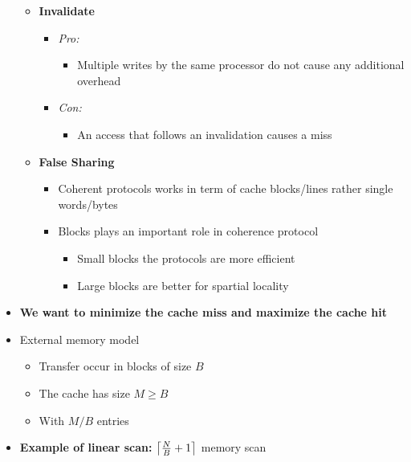 \documentclass[12pt,oneside]{report}
\DeclarePairedDelimiter\ceil{\lceil}{\rceil}
\begin{document}
\begin{itemize}
\begin{itemize}
\begin{itemize}
\begin{itemize}
            \end{itemize}
        \end{itemize}
        \item \textbf{Invalidate}
        \begin{itemize}
            \item \textit{Pro:}
            \begin{itemize}
                \item Multiple writes by the same processor do not cause any additional overhead
            \end{itemize}
            \item \textit{Con:}
            \begin{itemize}
                \item An access that follows an invalidation causes a miss
            \end{itemize}
        \end{itemize}
        \item \textbf{False Sharing}
        \begin{itemize}
            \item Coherent protocols works in term of cache blocks/lines rather single words/bytes
            \item Blocks plays an important role in coherence protocol
            \begin{itemize}
                \item Small blocks the protocols are more efficient
                \item Large blocks are better for spartial locality
            \end{itemize}
        \end{itemize}
    \end{itemize}
    \item \textbf{We want to minimize the cache miss and maximize the cache hit}
    \item External memory model
    \begin{itemize}
        \item Transfer occur in blocks of size \(B\)
        \item The cache has size \(M \geq B\)
        \item With \(M/B\) entries
    \end{itemize}
    \item \textbf{Example of linear scan:} \(\ceil*{\frac{N}{B}+1}\) memory scan
\end{itemize}
\end{document}

